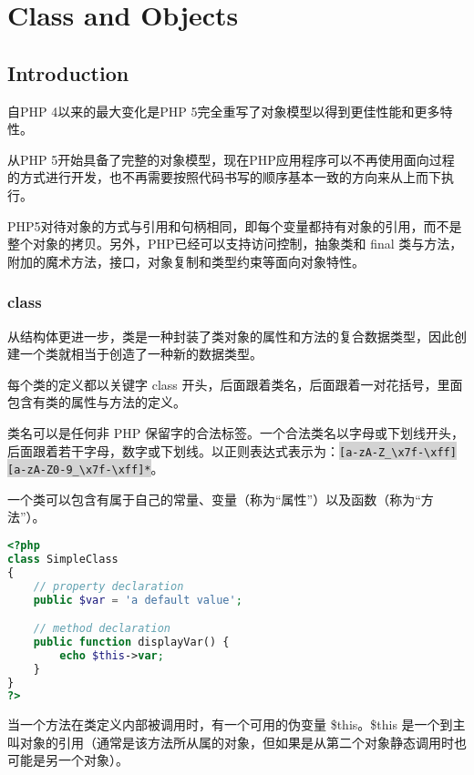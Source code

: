 \part{Class and Objects}







\chapter{Introduction}


自PHP 4以来的最大变化是PHP 5完全重写了对象模型以得到更佳性能和更多特性。

从PHP 5开始具备了完整的对象模型，现在PHP应用程序可以不再使用面向过程的方式进行开发，也不再需要按照代码书写的顺序基本一致的方向来从上而下执行。

PHP5对待对象的方式与引用和句柄相同，即每个变量都持有对象的引用，而不是整个对象的拷贝。另外，PHP已经可以支持访问控制，抽象类和 final 类与方法，附加的魔术方法，接口，对象复制和类型约束等面向对象特性。



\section{class}

从结构体更进一步，类是一种封装了类对象的属性和方法的复合数据类型，因此创建一个类就相当于创造了一种新的数据类型。


每个类的定义都以关键字 class 开头，后面跟着类名，后面跟着一对花括号，里面包含有类的属性与方法的定义。

类名可以是任何非 PHP 保留字的合法标签。一个合法类名以字母或下划线开头，后面跟着若干字母，数字或下划线。以正则表达式表示为：\colorbox{lightgray}{\texttt{[a-zA-Z\_\textbackslash x7f-\textbackslash xff][a-zA-Z0-9\_\textbackslash x7f-\textbackslash xff]*}}。

一个类可以包含有属于自己的常量、变量（称为“属性”）以及函数（称为“方法”）。

\begin{lstlisting}[language=PHP]
<?php
class SimpleClass
{
    // property declaration
    public $var = 'a default value';

    // method declaration
    public function displayVar() {
        echo $this->var;
    }
}
?>
\end{lstlisting}

当一个方法在类定义内部被调用时，有一个可用的伪变量 \$this。\$this 是一个到主叫对象的引用（通常是该方法所从属的对象，但如果是从第二个对象静态调用时也可能是另一个对象）。




